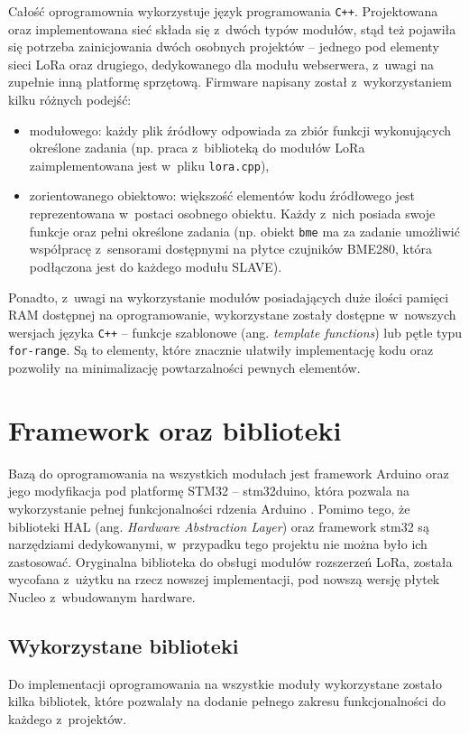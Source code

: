 Całość oprogramownia wykorzystuje język programowania \texttt{C++}. Projektowana oraz implementowana sieć składa się
z~dwóch typów modułów, stąd też pojawiła się potrzeba zainicjowania dwóch osobnych projektów -- jednego pod elementy
sieci LoRa oraz drugiego, dedykowanego dla modułu webserwera, z~uwagi na zupełnie inną platformę sprzętową. Firmware
napisany został z~wykorzystaniem kilku różnych podejść:
\begin{itemize}[label=--]
    \item modułowego: każdy plik źródłowy odpowiada za zbiór funkcji wykonujących określone zadania (np. praca
          z~biblioteką do modułów LoRa zaimplementowana jest w~pliku \texttt{lora.cpp}),
    \item zorientowanego obiektowo: większość elementów kodu źródłowego jest reprezentowana w~postaci osobnego
          obiektu. Każdy z~nich posiada swoje funkcje oraz pełni określone zadania (np. obiekt \texttt{bme} ma za
          zadanie umożliwić współpracę z~sensorami dostępnymi na płytce czujników BME280, która podłączona jest do
          każdego modułu SLAVE).
\end{itemize}
Ponadto, z~uwagi na wykorzystanie modułów posiadających duże ilości pamięci RAM dostępnej na oprogramowanie,
wykorzystane zostały dostępne w~nowszych wersjach języka \texttt{C++} -- funkcje szablonowe (ang. \textsl{template
    functions}) lub pętle typu \texttt{for-range}. Są to elementy, które znacznie ułatwiły implementację kodu oraz
pozwoliły na minimalizację powtarzalności pewnych elementów.

\section{Framework oraz biblioteki\label{sect:framework-libraries}} Bazą do oprogramowania na wszystkich modułach jest
framework Arduino oraz jego modyfikacja pod platformę STM32 -- stm32duino, która pozwala na wykorzystanie pełnej
funkcjonalności rdzenia Arduino \cite{stm32duino-docs}. Pomimo tego, że biblioteki HAL (ang. \textsl{Hardware
    Abstraction Layer}) oraz framework stm32 są narzędziami dedykowanymi, w~przypadku tego projektu nie można było ich
zastosować. Oryginalna biblioteka do obsługi modułów rozszerzeń LoRa, została wycofana z~użytku na rzecz nowszej
implementacji, pod nowszą wersję płytek Nucleo z~wbudowanym hardware.

\subsection{Wykorzystane biblioteki\label{sect:used-libs}} Do implementacji oprogramowania na wszystkie moduły
wykorzystane zostało kilka bibliotek, które pozwalały na dodanie pełnego zakresu funkcjonalności do każdego z~projektów.

